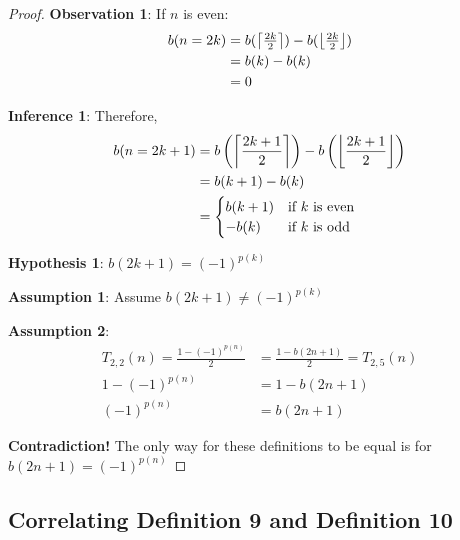 \documentclass[conference]{IEEEtran}
\begin{document}
\begin{proof}
\par\noindent\par
    \textbf{Observation 1}: If $n$ is even:\begin{equation}\begin{aligned}    
    b(n = 2k) &= b(\left\lceil \tfrac{2k}{2} \right\rceil) - b(\left\lfloor \tfrac{2k}{2} \right\rfloor) \\
    &= b(k) - b(k) \\&= 0
    \end{aligned}
    \end{equation}

    \textbf{Inference 1}: Therefore, \begin{equation}
\begin{aligned}
    b(n=2k+1) &= b\left(\left\lceil \dfrac{2k+1}{2} \right\rceil\right) - b\left(\left\lfloor \dfrac{2k+1}{2} \right\rfloor\right) \\
              &= b(k + 1) - b(k) \\
              &= \begin{cases}
                  b(k+1) & \text{if } k \text{ is even} \\
                  -b(k)  & \text{if } k \text{ is odd}
              \end{cases}
\end{aligned}
    \end{equation}

    \textbf{Hypothesis 1}: $b(2k+1) = (-1)^{p(k)}$

    \textbf{Assumption 1}: Assume $b(2k+1) \ne (-1)^{p(k)}$

    \textbf{Assumption 2}: \begin{equation}\begin{aligned}
    T_{2,2}(n) = \tfrac{1 - (-1)^{p(n)}}{2} &= \tfrac{1 - b(2n+1)}{2} = T_{2,5}(n) \\
    1 - (-1)^{p(n)} &= 1 - b(2n+1) \\
    (-1)^{p(n)} &= b(2n+1)
    \end{aligned}
    \end{equation}

    \textbf{Contradiction!} The only way for these definitions to be equal is for $b(2n+1) = (-1)^{p(n)}$

\end{proof}

\subsection{Correlating Definition 9 and Definition 10}
\end{document}
